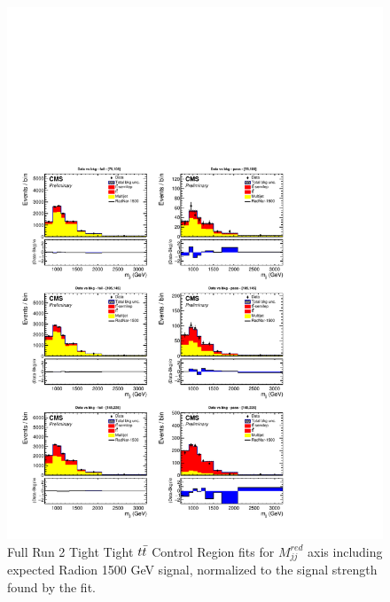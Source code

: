 \begin{figure}[!htb]
	\centering
	\includegraphics[width=1\textwidth]{Figures/postfit_projy_fits_TTtt.pdf}
	\caption{Full Run 2 Tight Tight $t\bar{t} $ Control Region fits for $M_{jj}^{red}$ axis including expected Radion 1500 GeV signal, normalized to the signal strength found by the fit.}
	\label{fig:TTttmjj}
\end{figure}
\clearpage
